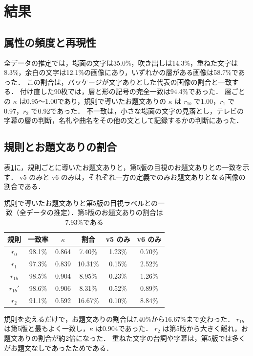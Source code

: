 \section{結果}
\label{sec_results}
\subsection{属性の頻度と再現性}
全データの推定では，場面の文字は35.0\%，吹き出しは14.3\%，重ねた文字は8.3\%，余白の文字は12.1\%の画像にあり，いずれかの層がある画像は58.7\%であった．
この割合は，パッケージが文字ありとした代表の画像の割合と一致する．
付け直した90枚では，層と形の記号の完全一致は94.4\%であった．
層ごとの $ \kappa $ は0.95〜1.00であり，規則で導いたお題文ありの $ \kappa $ は $ r_{1b} $ で1.00，$ r_1 $ で0.97，$ r_2 $ で0.92であった．
不一致は，小さな場面の文字の見落とし，テレビの字幕の層の判断，名札や曲名をその他の文として記録するかの判断にあった．

\subsection{規則とお題文ありの割合}
表\ref{tab_shift}に，規則ごとに導いたお題文ありと，第5版の目視のお題文ありとの一致を示す．
v5 のみと v6 のみは，それぞれ一方の定義でのみお題文ありとなる画像の割合である．

\begin{table}[t]
    \centering
    \caption{規則で導いたお題文ありと第5版の目視ラベルとの一致（全データの推定）．第5版のお題文ありの割合は7.93\%である}
    \label{tab_shift}
    \small
    \begin{tabular}{cccccc}
        \toprule
        規則 & 一致率 & $ \kappa $ & 割合 & v5 のみ & v6 のみ \\
        \midrule
        $ r_0 $ & 98.1\% & 0.864 & 7.40\% & 1.23\% & 0.70\% \\
        $ r_1 $ & 97.3\% & 0.839 & 10.31\% & 0.15\% & 2.52\% \\
        $ r_{1b} $ & 98.5\% & 0.904 & 8.95\% & 0.23\% & 1.26\% \\
        $ r_{1b}' $ & 98.6\% & 0.906 & 8.31\% & 0.52\% & 0.89\% \\
        $ r_2 $ & 91.1\% & 0.592 & 16.67\% & 0.10\% & 8.84\% \\
        \bottomrule
    \end{tabular}
\end{table}

規則を変えるだけで，お題文ありの割合は7.40\%から16.67\%まで変わった．
$ r_{1b} $ は第5版と最もよく一致し，$ \kappa $ は0.904であった．
$ r_2 $ は第5版から大きく離れ，お題文ありの割合が約2倍になった．
重ねた文字の台詞や字幕は，第5版では多くがお題文なしであったためである．

